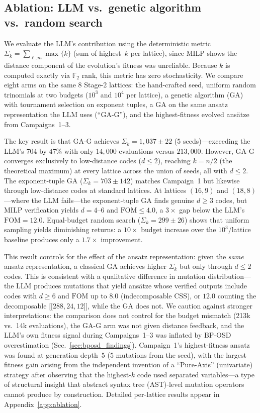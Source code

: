 \documentclass[aps,prxquantum,twocolumn,superscriptaddress,nofootinbib]{revtex4-2}
\newcommand{\FF}{\ensuremath{\mathbb{F}}}
\newcommand{\dblbrk}[1]{\ensuremath{\lbrack\!\lbrack #1 \rbrack\!\rbrack}}
\newcommand{\code}[1]{\dblbrk{#1}}
\newcommand{\FOM}{\ensuremath{\mathrm{FOM}}}
\begin{document}
\subsection{Ablation: LLM vs.\ genetic algorithm vs.\ random search}
\label{sec:ablation}

We evaluate the LLM's contribution using the deterministic metric $\Sigma_k = \sum_{\ell,m} \max\{k\}$ (sum of highest~$k$ per lattice), since MILP shows the distance component of the evolution's fitness was unreliable. 
Because $k$ is computed exactly via $\FF_2$ rank, this metric has zero stochasticity.
We compare eight arms on the same 8 Stage-2 lattices: the hand-crafted seed, uniform random trinomials at two budgets ($10^3$ and $10^4$ per lattice), a genetic algorithm (GA) with tournament selection on exponent tuples, a GA on the same ansatz representation the LLM uses (``GA-G''), and the highest-fitness evolved ansätze from Campaigns~1--3.

The key result is that GA-G achieves $\Sigma_k = 1{,}037 \pm 22$ (5 seeds)---exceeding the LLM's $704$ by $47\%$ with only $14{,}000$ evaluations versus $213{,}000$.
However, GA-G converges exclusively to low-distance codes ($d \leq 2$), reaching $k = n/2$ (the theoretical maximum) at every lattice across the union of seeds, all with $d \leq 2$.
The exponent-tuple GA ($\Sigma_k = 703 \pm 142$) matches Campaign~1 but likewise through low-distance codes at standard lattices.
At lattices $(16,9)$ and $(18,8)$---where the LLM fails---the exponent-tuple GA finds genuine $d \geq 3$ codes, but MILP verification yields $d = 4$--$6$ and $\FOM \leq 4.0$, a $3\times$ gap below the LLM's $\FOM = 12.0$.
Equal-budget random search ($\Sigma_k = 299 \pm 26$) shows that uniform sampling yields diminishing returns: a $10\times$ budget increase over the $10^3$/lattice baseline produces only a $1.7\times$ improvement.

This result controls for the effect of the ansatz representation: given the \emph{same} ansatz representation, a classical GA achieves higher $\Sigma_k$ but only through $d \leq 2$ codes.
This is consistent with a qualitative difference in mutation distribution---the LLM produces mutations that yield ans\"atze whose verified outputs include codes with $d \geq 6$ and $\FOM$ up to $8.0$ (indecomposable CSS), or $12.0$ counting the decomposable $\code{288,24,12}$, while the GA does not.
We caution against stronger interpretations: the comparison does not control for the budget mismatch (213k vs.\ 14k evaluations), the GA-G arm was not given distance feedback, and the LLM's own fitness signal during Campaigns~1--3 was inflated by BP-OSD overestimation (Sec.~\ref{sec:bposd_findings}).
Campaign~1's highest-fitness ansatz was found at generation depth~5 (5 mutations from the seed), with the largest fitness gain arising from the independent invention of a ``Pure-Axis'' (univariate) strategy after observing that the highest-$k$ code used separated variables---a type of structural insight that abstract syntax tree (AST)-level mutation operators cannot produce by construction.
Detailed per-lattice results appear in Appendix~\ref{app:ablation}.
\end{document}
